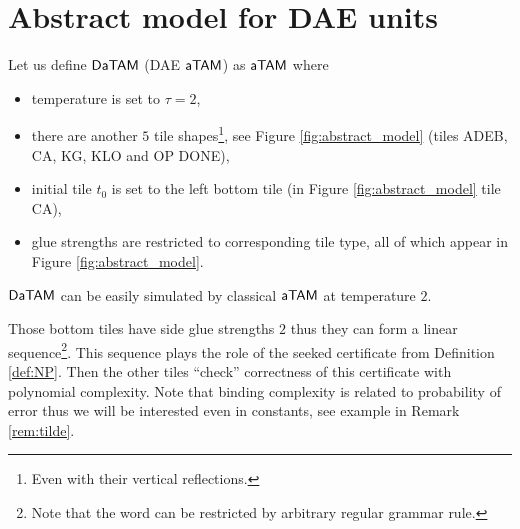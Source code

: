 \section{Abstract model for DAE units}

\begin{defn}
	Let us define $\mathsf{DaTAM}$ (DAE $\mathsf{aTAM}$) as $\mathsf{aTAM}$ where
	\begin{itemize}
		\item temperature is set to $\tau = 2$,
		\item there are another $5$ tile shapes\footnote{Even with their vertical reflections.}, see Figure \ref{fig:abstract_model} (tiles {\sf ADEB}, {\sf CA}, {\sf KG}, {\sf KLO} and {\sf OP DONE}),
		\item initial tile $t_0$ is set to the left bottom tile (in Figure \ref{fig:abstract_model} tile {\sf CA}),
		\item glue strengths are restricted to corresponding tile type, all of which appear in Figure \ref{fig:abstract_model}.
	\end{itemize}
\end{defn}

\begin{note}
	$\mathsf{DaTAM}$ can be easily simulated by classical $\mathsf{aTAM}$ at temperature $2$.
\end{note}

Those bottom tiles have side glue strengths $2$ thus they can form a linear sequence\footnote{Note that the word can be restricted by arbitrary regular grammar rule.}. This sequence plays the role of the seeked certificate from Definition \ref{def:NP}. Then the other tiles ``check'' correctness of this certificate with polynomial complexity. Note that binding complexity is related to probability of error thus we will be interested even in constants, see example in Remark \ref{rem:tilde}.



